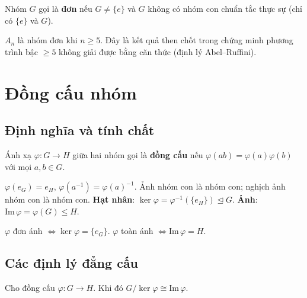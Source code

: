\documentclass[12pt,a4paper]{article}
\begin{document}
\begin{dinhnghia}
  Nhóm $G$ gọi là \textbf{đơn} nếu $G \ne \{e\}$ và $G$ không có nhóm con chuẩn tắc thực sự (chỉ có $\{e\}$ và $G$).
\end{dinhnghia}

\begin{dinhly}
  $A_n$ là nhóm đơn khi $n \ge 5$. Đây là kết quả then chốt trong chứng minh phương trình bậc $\ge 5$ không giải được bằng căn thức (định lý Abel--Ruffini).
\end{dinhly}

\section{Đồng cấu nhóm}

\subsection{Định nghĩa và tính chất}

\begin{dinhnghia}
  Ánh xạ $\varphi: G \to H$ giữa hai nhóm gọi là \textbf{đồng cấu} nếu $\varphi(ab) = \varphi(a)\varphi(b)$ với mọi $a, b \in G$.
\end{dinhnghia}

\begin{tinhchat}
  $\varphi(e_G) = e_H$, $\varphi(a^{-1}) = \varphi(a)^{-1}$. Ảnh nhóm con là nhóm con; nghịch ảnh nhóm con là nhóm con. \textbf{Hạt nhân}: $\ker \varphi = \varphi^{-1}(\{e_H\}) \trianglelefteq G$. \textbf{Ảnh}: $\mathrm{Im}\,\varphi = \varphi(G) \le H$.
\end{tinhchat}

\begin{tinhchat}
  $\varphi$ đơn ánh $\Leftrightarrow \ker \varphi = \{e_G\}$. $\varphi$ toàn ánh $\Leftrightarrow \mathrm{Im}\,\varphi = H$.
\end{tinhchat}

\subsection{Các định lý đẳng cấu}

\begin{dinhly}[title={Định lý đẳng cấu thứ nhất}]
  Cho đồng cấu $\varphi: G \to H$. Khi đó $G/\ker \varphi \cong \mathrm{Im}\,\varphi$.
\end{dinhly}
\end{document}
